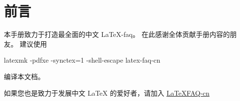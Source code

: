 \section*{前言}
本手册致力于打造最全面的中文 \LaTeX{}-faq。
在此感谢全体贡献手册内容的朋友。
建议使用
\begin{shcode}
  latexmk -pdfxe -synctex=1 -shell-escape latex-faq-cn
\end{shcode}
编译本文档。

如果您也是致力于发展中文 \LaTeX{} 的爱好者，请加入 \href{https://github.com/latexstudio/LaTeXFAQ-cn}{LaTeXFAQ-cn}
\clearpage